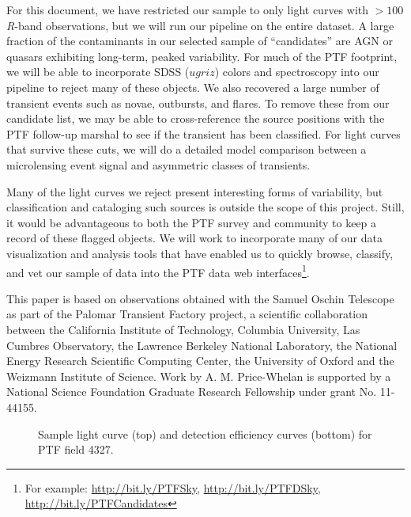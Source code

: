 \documentclass{emulateapj}
\begin{document}
For this document, we have restricted our sample to only light curves with $>100$ \textit{R}-band observations, but we will run our pipeline on the entire dataset. A large fraction of the contaminants in our selected sample of ``candidates'' are AGN or quasars exhibiting long-term, peaked variability. For much of the PTF footprint, we will be able to incorporate SDSS ($ugriz$) colors and spectroscopy into our pipeline to reject many of these objects. We also recovered a large number of transient events such as novae, outbursts, and flares. To remove these from our candidate list, we may be able to cross-reference the source positions with the PTF follow-up marshal to see if the transient has been classified. For light curves that survive these cuts, we will do a detailed model comparison between a microlensing event signal and asymmetric classes of transients. 

Many of the light curves we reject present interesting forms of variability, but classification and cataloging such sources is outside the scope of this project. Still, it would be advantageous to both the PTF survey and community to keep a record of these flagged objects. We will work to incorporate many of our data visualization and analysis tools that have enabled us to quickly browse, classify, and vet our sample of data into the PTF data web interfaces\footnote{For example: \url{http://bit.ly/PTFSky}, \url{http://bit.ly/PTFDSky}, \url{http://bit.ly/PTFCandidates}}. 

\acknowledgments
This paper is based on observations obtained with the Samuel Oschin Telescope as part of the Palomar Transient Factory project, a scientific collaboration between the California Institute of Technology, Columbia University, Las Cumbres Observatory, the Lawrence Berkeley National Laboratory, the National Energy Research Scientific Computing Center, the University of Oxford and the Weizmann Institute of Science. Work by A. M. Price-Whelan is supported by a National Science Foundation Graduate Research Fellowship under grant No. 11-44155.

\setlength{\baselineskip}{0.6\baselineskip}

\setlength{\baselineskip}{1.667\baselineskip}


%
%

\begin{figure}
\centering
	
\caption{Sample light curve (top) and detection efficiency curves (bottom) for PTF field 4327.}  \label{fig:detection_efficiency_4327}
\end{figure}
\end{document}
